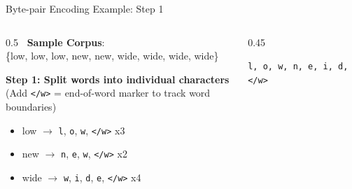 \documentclass[aspectratio=169,xcolor=dvipsnames,svgnames,x11names,fleqn]{beamer}
\begin{document}
\begin{frame}{Byte-pair Encoding Example: Step 1}
    \begin{columns}[T]
        \begin{column}{0.5\textwidth}
            \textbf{\faDatabase \ Sample Corpus}: \\
            \footnotesize \{low, low, low, new, new, wide, wide, wide, wide\}
            
            \vspace{1em}
            \textbf{Step 1: Split words into individual characters} \\
            \scriptsize (Add \texttt{</w>} = end-of-word marker to track word boundaries)
            
            \begin{itemize}
                \item \scriptsize low $\rightarrow$ \texttt{l}, \texttt{o}, \texttt{w}, \texttt{</w>} x3
                \item \scriptsize new $\rightarrow$ \texttt{n}, \texttt{e}, \texttt{w}, \texttt{</w>} x2
                \item \scriptsize wide $\rightarrow$ \texttt{w}, \texttt{i}, \texttt{d}, \texttt{e}, \texttt{</w>} x4
            \end{itemize}
        \end{column}
        
        \begin{column}{0.45\textwidth}
            \begin{tcolorbox}[title=Initial Vocabulary, colframe=vocabcolor, colback=vocabcolor!5]
                \centering \textcolor{vocabcolor}{\texttt{l, o, w, n, e, i, d, </w>}}
            \end{tcolorbox}
        \end{column}
    \end{columns}
\end{frame}
\end{document}
